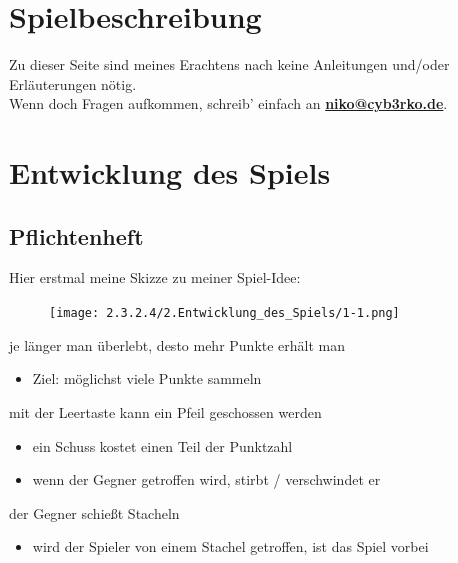 \documentclass{scrartcl}   %
\begin{document}
\cleardoublepage

\section{Spielbeschreibung}

Zu dieser Seite sind meines Erachtens nach keine Anleitungen und/oder Erläuterungen nötig.\\
Wenn doch Fragen aufkommen, schreib' einfach an \textbf{\href{mailto:niko@cyb3rko.de}{niko@cyb3rko.de}}.

\newpage

\section{Entwicklung des Spiels}

\subsection{Pflichtenheft}

Hier erstmal meine Skizze zu meiner Spiel-Idee:\\
\begin{figure}[ht]
\begin{turn}{-90}
	\texttt{[image: 2.3.2.4/2.Entwicklung\_des\_Spiels/1-1.png]}
\end{turn}
\end{figure}

\begin{itemize}
    \barrow je länger man überlebt, desto mehr Punkte erhält man
    \begin{itemize}
        \item Ziel: möglichst viele Punkte sammeln
    \end{itemize}
    \barrow mit der Leertaste kann ein Pfeil geschossen werden
    \begin{itemize}
        \item ein Schuss kostet einen Teil der Punktzahl
        \item wenn der Gegner getroffen wird, stirbt / verschwindet er
    \end{itemize}
    \newpage
    \barrow der Gegner schießt Stacheln
    \begin{itemize}
        \item wird der Spieler von einem Stachel getroffen, ist das Spiel vorbei
    \end{itemize}
\end{itemize}
\end{document}
